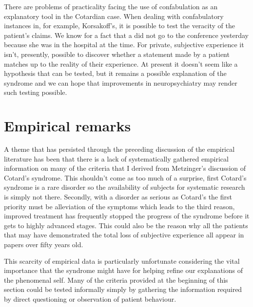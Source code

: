 There are problems of practicality facing the use of confabulation as an explanatory tool in the Cotardian case. When dealing with confabulatory instances in, for example, Korsakoff's, it is possible to test the veracity of the patient's claims. We know for a fact that a did not go to the conference yesterday because she was in the hospital at the time. For private, subjective experience it isn't, presently, possible to discover whether a statement made by a patient matches up to the reality of their experience. At present it doesn't seem like a hypothesis that can be tested, but it remains a possible explanation of the syndrome and we can hope that improvements in neuropsychiatry may render such testing possible.

\section{Empirical remarks}

A theme that has persisted through the preceding discussion of the empirical literature has been that there is a lack of systematically gathered empirical information on many of the criteria that I derived from Metzinger's discussion of Cotard's syndrome. This shouldn't come as too much of a surprise, first Cotard's syndrome is a rare disorder so the availability of subjects for systematic research is simply not there. Secondly, with a disorder as serious as Cotard's the first priority must be alleviation of the symptoms which leads to the third reason, improved treatment has frequently stopped the progress of the syndrome before it gets to highly advanced stages\cite{enoch1991}. This could also be the reason why all the patients that may have demonstrated the total loss of subjective experience all appear in papers over fifty years old.

This scarcity of empirical data is particularly unfortunate considering the vital importance that the syndrome might have for helping refine our explanations of the phenomenal self. Many of the criteria provided at the beginning of this section could be tested informally simply by gathering the information required by direct questioning or observation of patient behaviour.


